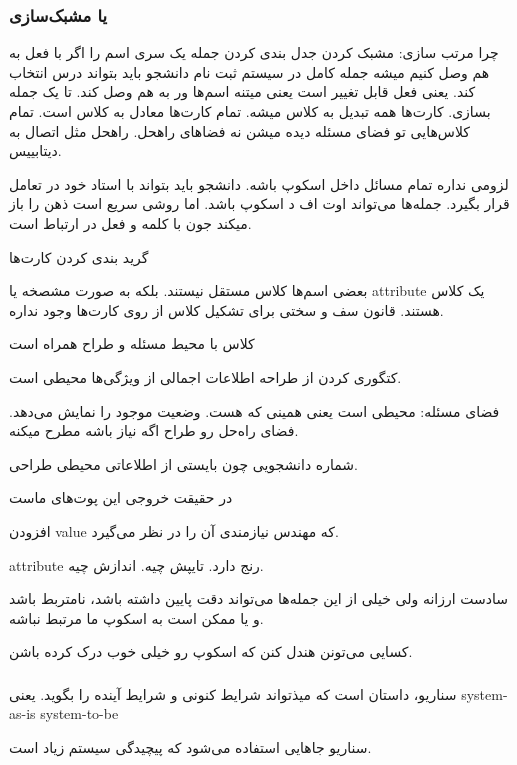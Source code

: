 
\subsubsection{ یا
مشبک‌سازی}

چرا مرتب سازی:
مشبک کردن جدل بندی کردن
جمله یک سری اسم را اگر با فعل به هم وصل کنیم میشه جمله کامل
در سیستم ثبت نام دانشجو باید بتواند درس انتخاب کند.
یعنی فعل قابل تغییر است یعنی میتنه اسم‌ها ور به هم وصل کند. تا یک جمله بسازی.
کارت‌ها همه تبدیل به کلاس میشه. 
تمام کارت‌ها معادل به کلاس است. تمام کلاس‌هایی تو فضای مسئله دیده میشن نه
فضا‌های راهحل.  راهحل مثل اتصال به دیتابییس.

لزومی نداره تمام مسائل داخل اسکوپ باشه. 
دانشجو باید بتواند با استاد خود در تعامل قرار بگیرد.
جمله‌ها می‌تواند اوت اف د اسکوپ باشد.
اما روشی سریع است
ذهن را باز میکند جون با کلمه و فعل در ارتباط است.

گرید بندی کردن کارت‌ها

بعضی اسم‌ها کلاس مستقل نیستند. بلکه به صورت مشصخه یا attribute یک کلاس هستند.
قانون سف و سختی برای تشکیل کلاس از روی کارت‌ها وجود نداره.

کلاس با محیط مسئله و طراح همراه است

کتگوری کردن از طراحه
اطلاعات اجمالی از ویژگی‌ها محیطی است.

فضای مسئله: محیطی است یعنی همینی که هست. وضعیت موجود را نمایش می‌دهد.
فضای راه‌حل رو طراح اگه نیاز باشه مطرح میکنه.

شماره دانشجویی چون بایستی از اطلاعاتی محیطی طراحی.

در حقیقت خروجی این پوت‌های ماست

افزودن value که مهندس نیازمندی آن را در نظر می‌گیرد.

attribute رنج دارد. تایپش چیه. اندازش چیه.

سادست ارزانه
ولی خیلی از این جمله‌ها می‌تواند دقت پایین داشته باشد، نامتربط باشد و یا ممکن
است به اسکوپ ما مرتبط نباشه.

کسایی می‌تونن هندل کنن که اسکوپ رو خیلی خوب درک کرده باشن.


\subsubsection{}

سناریو، داستان است که میذتواند شرایط کنونی و شرایط آینده را بگوید. 
یعنی system-as-is
system-to-be

سناریو جاهایی استفاده می‌شود که پیچیدگی سیستم زیاد است.


